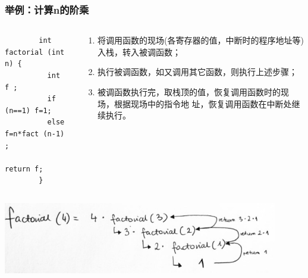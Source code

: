 \begin{frame}[fragile]
  \frametitle{举例：计算n的阶乘}
  \scriptsize
  \begin{columns}
    \begin{column}[T]{0.4\linewidth}
      \begin{verbatim}
        int factorial (int n) {
          int  f ;
          if (n==1) f=1;
          else f=n*fact (n-1) ;
          return f;
        }
      \end{verbatim}
    \end{column}
    \begin{column}[T]{0.6\linewidth}
      \begin{enumerate}
      \item 将调用函数的现场(各寄存器的值，中断时的程序地址等)入栈，转入被调函数；
      \item 执行被调函数，如又调用其它函数，则执行上述步骤；
      \item 被调函数执行完，取栈顶的值，恢复调用函数时的现场，根据现场中的指令地
        址，恢复调用函数在中断处继续执行。
      \end{enumerate}
    \end{column}
  \end{columns}
  \includegraphics[width=0.9\textwidth]{figs/stack/factorial.png}
\end{frame}

